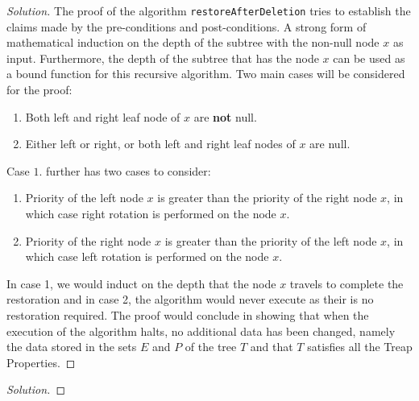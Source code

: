 \documentclass[12pt]{article}
\newenvironment{problem}[2][Problem]{\begin{trivlist}
\item[\hskip \labelsep {\bfseries #1}\hskip \labelsep {\bfseries #2.}]}{\end{trivlist}}
\newenvironment{solution}{\renewcommand\qedsymbol{$\blacksquare$}\begin{proof}[Solution]}{\end{proof}}
\begin{document}
\begin{solution}
The proof of the algorithm \texttt{restoreAfterDeletion} tries to establish the claims made by the pre-conditions and post-conditions. A strong form of mathematical induction on the depth of the subtree with the non-null node $x$ as input. Furthermore, the depth of the subtree that has the node $x$ can be used as a bound function for this recursive algorithm. Two main cases will be considered for the proof:

\begin{enumerate}
    \item Both left and right leaf node of $x$ are \textbf{not} null.
    \item  Either left or right, or both left and right leaf nodes of $x$ are null.
\end{enumerate}

Case $1.$ further has two cases to consider:
\begin{enumerate}[label=(\alph*)]
    \item Priority of the left node $x$ is greater than the priority of the right node $x$, in which case right rotation is performed on the node $x$.
    \item Priority of the right node $x$ is greater than the priority of the left node $x$, in which case left rotation is performed on the node $x$.
\end{enumerate}
In case 1, we would induct on the depth that the node $x$ travels to complete the restoration and in case 2, the algorithm would never execute as their is no restoration required. The proof would conclude in showing that when the execution of the algorithm halts, no additional data has been changed, namely the data stored in the sets $E$ and $P$ of the tree $T$ and that $T$ satisfies all the Treap Properties.
\end{solution}


\begin{problem}{10}

\end{problem}

\begin{solution}

\end{solution}


\begin{problem}{11}

\end{problem}
\end{document}
